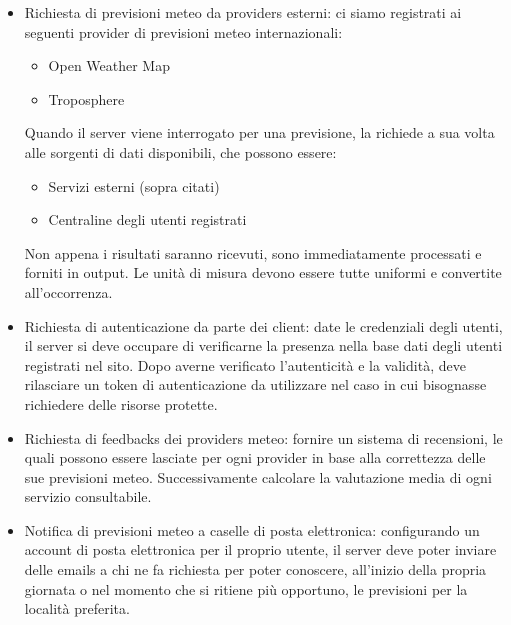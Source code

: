     \begin{itemize}
    
        \item Richiesta di previsioni meteo da providers esterni: ci siamo registrati ai seguenti provider di previsioni meteo internazionali:
        
        \begin{itemize}
            
            \item Open Weather Map
            \item Troposphere
        
        \end{itemize}
        
        Quando il server viene interrogato per una previsione, la richiede a sua volta alle sorgenti di dati disponibili, che possono essere:
        
        \begin{itemize}
            \item Servizi esterni (sopra citati)
            \item Centraline degli utenti registrati
        \end{itemize}
        
        Non appena i risultati saranno ricevuti, sono immediatamente processati e forniti in output. Le unità di misura devono essere tutte uniformi e convertite all'occorrenza.
        
        \item Richiesta di autenticazione da parte dei client: date le credenziali degli utenti, il server si deve occupare di verificarne la presenza nella base dati degli utenti registrati nel sito. Dopo averne verificato l'autenticità e la validità, deve rilasciare un token di autenticazione da utilizzare nel caso in cui bisognasse richiedere delle risorse protette.
        
        \item Richiesta di feedbacks dei providers meteo: fornire un sistema di recensioni, le quali possono essere lasciate per ogni provider in base alla correttezza delle sue previsioni meteo. Successivamente calcolare la valutazione media di ogni servizio consultabile.
        
        \item Notifica di previsioni meteo a caselle di posta elettronica: configurando un account di posta elettronica per il proprio utente, il server deve poter inviare delle emails a chi ne fa richiesta per poter conoscere, all'inizio della propria giornata o nel momento che si ritiene più opportuno, le previsioni per la località preferita.
        
    \end{itemize}
    
